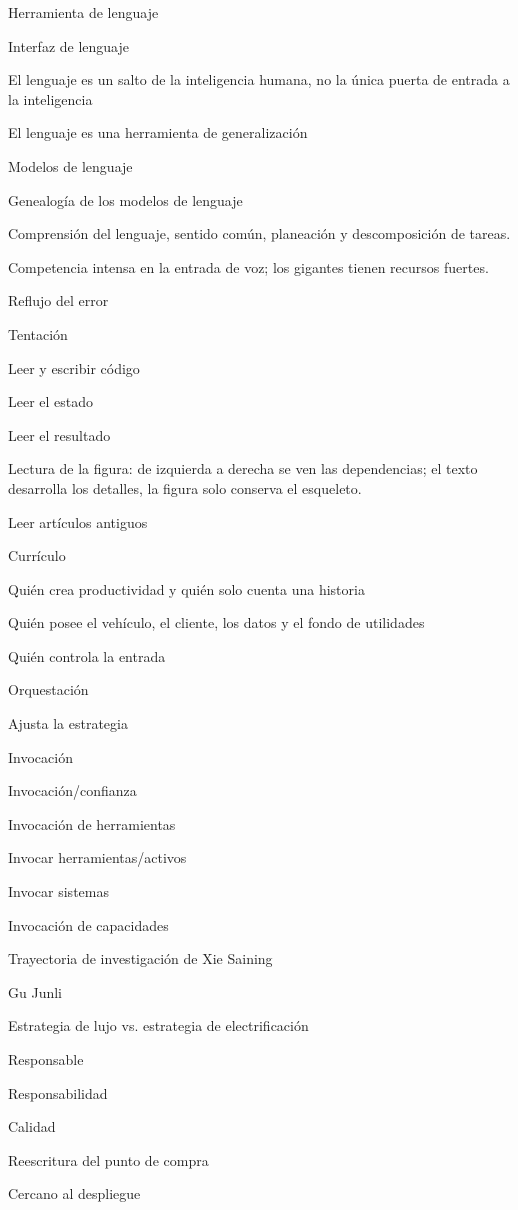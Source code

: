 \documentclass{article}
\begin{document}
Herramienta de lenguaje

Interfaz de lenguaje

El lenguaje es un salto de la inteligencia humana, no la única puerta de entrada a la inteligencia

El lenguaje es una herramienta de generalización

Modelos de lenguaje

Genealogía de los modelos de lenguaje

Comprensión del lenguaje, sentido común, planeación y descomposición de tareas.

Competencia intensa en la entrada de voz; los gigantes tienen recursos fuertes.

Reflujo del error

Tentación

Leer y escribir código

Leer el estado

Leer el resultado

Lectura de la figura: de izquierda a derecha se ven las dependencias; el texto desarrolla los detalles, la figura solo conserva el esqueleto.

Leer artículos antiguos

Currículo

Quién crea productividad y quién solo cuenta una historia

Quién posee el vehículo, el cliente, los datos y el fondo de utilidades

Quién controla la entrada

Orquestación

Ajusta la estrategia

Invocación

Invocación/confianza

Invocación de herramientas

Invocar herramientas/activos

Invocar sistemas

Invocación de capacidades

Trayectoria de investigación de Xie Saining

Gu Junli

Estrategia de lujo vs. estrategia de electrificación

Responsable

Responsabilidad

Calidad

Reescritura del punto de compra

Cercano al despliegue
\end{document}
